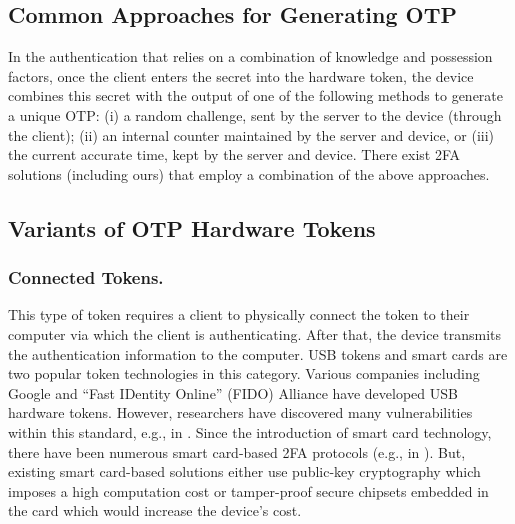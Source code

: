 \vspace{-4mm}
\subsection{Common Approaches for Generating OTP}
\vspace{-2mm}

In the authentication that relies on a combination of knowledge and possession factors, once the client enters the secret into the hardware token, the device combines this secret with the output of one of the following methods to generate a unique OTP:  (i) a random challenge, sent by the server to the device (through the client);  (ii) an internal counter maintained by the server and device, or (iii) the current accurate time, kept by the server and device. There exist 2FA solutions (including ours) that employ a combination of the above approaches. 

\vspace{-4mm}
\subsection{Variants of OTP Hardware Tokens}

\vspace{-2mm}
\subsubsection{Connected Tokens.}
This type of token requires a client to physically connect the token to their computer via which the client is authenticating. After that, the device transmits the authentication information to the computer. USB tokens and smart cards are two popular token technologies in this category.  Various companies including Google and  ``Fast IDentity Online'' (FIDO) Alliance have developed USB hardware tokens. However, researchers have discovered many vulnerabilities within this standard, e.g., in \cite{PanosMNPX17,ChangMSS17,LoutfiJ15,ndss/FengLP021}.  
%
Since the introduction of smart card technology, there have been numerous smart card-based 2FA protocols (e.g., in \cite{gupta2021machine,WangW18,radhakrishnan2022dependable,kim2009more}). But, existing smart card-based solutions either use public-key cryptography which imposes a high computation cost or tamper-proof secure chipsets embedded in the card which would increase the device's cost. 






